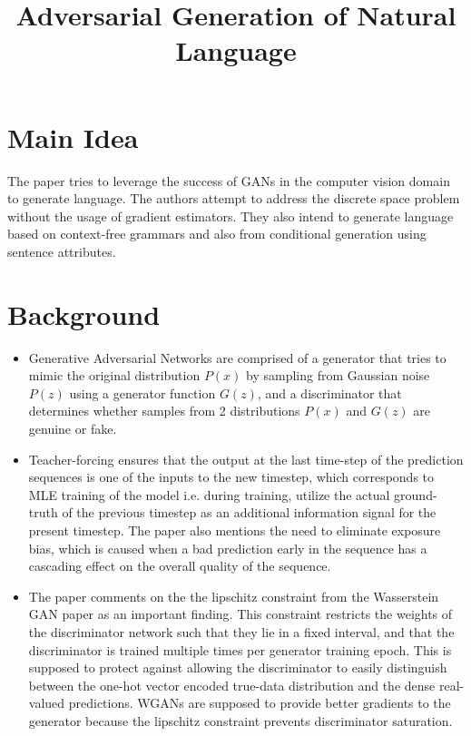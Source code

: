 \documentclass[12pt]{scrartcl}
\begin{document}
\title{Adversarial Generation of Natural Language}
\author{}
\date{}
\maketitle

\section{Main Idea}
The paper tries to leverage the success of GANs in the computer vision domain to generate language. The authors attempt to address the discrete space problem without the usage of gradient estimators. They also intend to generate language based on context-free grammars and also from conditional generation using sentence attributes. \cite{subramanian2017adversarial}

\section{Background}
  \begin{itemize}
    \item Generative Adversarial Networks \cite{goodfellow2014generative} are comprised of a generator that tries to mimic the original distribution $P(x)$ by sampling from Gaussian noise $P(z)$ using a generator function $G(z)$, and a discriminator that determines whether samples from 2 distributions $P(x)$ and $G(z)$ are genuine or fake. 
    \item Teacher-forcing ensures that the output at the last time-step of the prediction sequences is one of the inputs to the new timestep, which corresponds to MLE training of the model i.e. during training, utilize the actual ground-truth of the previous timestep as an additional information signal for the present timestep. The paper also mentions the need to eliminate exposure bias, which is caused when a bad prediction early in the sequence has a cascading effect on the overall quality of the sequence.
    \item The paper comments on the the lipschitz constraint from the Wasserstein GAN paper \cite{arjovsky2017wasserstein} as an important finding. This constraint restricts the weights of the discriminator network such that they lie in a fixed interval, and that the discriminator is trained multiple times per generator training epoch. This is supposed to protect against allowing the discriminator to easily distinguish between the one-hot vector encoded true-data distribution and the dense real-valued predictions. WGANs are supposed to provide better gradients to the generator because the lipschitz constraint prevents discriminator saturation.    
  \end{itemize}
\end{document}
